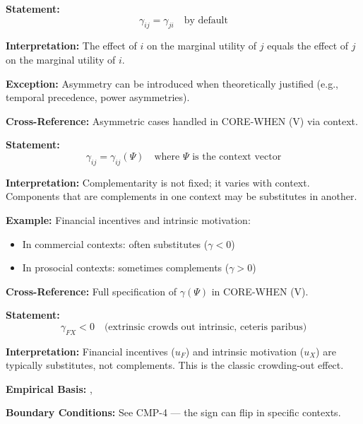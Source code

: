 \begin{tcolorbox}[colback=gray!5!white, colframe=gray!75!black,
    title=Axiom CMP-3: Default Symmetry]
\textbf{Statement:}
\begin{equation}
\gamma_{ij} = \gamma_{ji} \quad \text{by default}
\end{equation}

\textbf{Interpretation:} The effect of $i$ on the marginal utility of $j$ equals
the effect of $j$ on the marginal utility of $i$.

\textbf{Exception:} Asymmetry can be introduced when theoretically justified
(e.g., temporal precedence, power asymmetries).

\textbf{Cross-Reference:} Asymmetric cases handled in CORE-WHEN (V) via context.
\end{tcolorbox}

\begin{tcolorbox}[colback=gray!5!white, colframe=gray!75!black,
    title=Axiom CMP-4: Context Dependence]
\textbf{Statement:}
\begin{equation}
\gamma_{ij} = \gamma_{ij}(\Psi) \quad \text{where } \Psi \text{ is the context vector}
\end{equation}

\textbf{Interpretation:} Complementarity is not fixed; it varies with context.
Components that are complements in one context may be substitutes in another.

\textbf{Example:} Financial incentives and intrinsic motivation:
\begin{itemize}
\item In commercial contexts: often substitutes ($\gamma < 0$)
\item In prosocial contexts: sometimes complements ($\gamma > 0$)
\end{itemize}

\textbf{Cross-Reference:} Full specification of $\gamma(\Psi)$ in CORE-WHEN (V).
\end{tcolorbox}

\begin{tcolorbox}[colback=gray!5!white, colframe=gray!75!black,
    title=Axiom CMP-5: Crowding-Out Theorem]
\textbf{Statement:}
\begin{equation}
\gamma_{FX} < 0 \quad \text{(extrinsic crowds out intrinsic, ceteris paribus)}
\end{equation}

\textbf{Interpretation:} Financial incentives ($u_F$) and intrinsic motivation ($u_X$)
are typically substitutes, not complements. This is the classic crowding-out effect.

\textbf{Empirical Basis:} \citet{frey1997relationship}, \citet{deci1999meta}

\textbf{Boundary Conditions:} See CMP-4 --- the sign can flip in specific contexts.
\end{tcolorbox}

